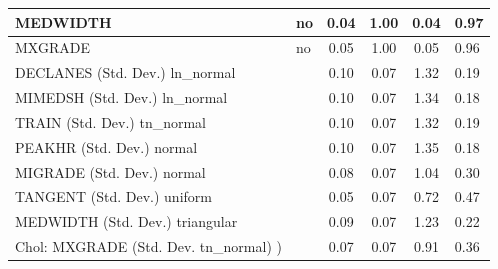 \begin{table}
\begin{center}
\begin{tabular}{|l|l|c|c|c|l|}
			\hline
			MEDWIDTH & no & 0.04 & 1.00 & 0.04 & 0.97 \\
			\hline
			MXGRADE & no & 0.05 & 1.00 & 0.05 & 0.96 \\
			\hline
			DECLANES (Std. Dev.) ln_normal &  & 0.10 & 0.07 & 1.32 & 0.19 \\
			\hline
			MIMEDSH (Std. Dev.) ln_normal &  & 0.10 & 0.07 & 1.34 & 0.18 \\
			\hline
			TRAIN (Std. Dev.) tn_normal &  & 0.10 & 0.07 & 1.32 & 0.19 \\
			\hline
			PEAKHR (Std. Dev.) normal &  & 0.10 & 0.07 & 1.35 & 0.18 \\
			\hline
			MIGRADE (Std. Dev.) normal &  & 0.08 & 0.07 & 1.04 & 0.30 \\
			\hline
			TANGENT (Std. Dev.) uniform &  & 0.05 & 0.07 & 0.72 & 0.47 \\
			\hline
			MEDWIDTH (Std. Dev.) triangular &  & 0.09 & 0.07 & 1.23 & 0.22 \\
			\hline
			 Chol: MXGRADE (Std. Dev. tn_normal) ) &  & 0.07 & 0.07 & 0.91 & 0.36 \\
			\hline
		\end{tabular}
	\end{center}
\end{table}